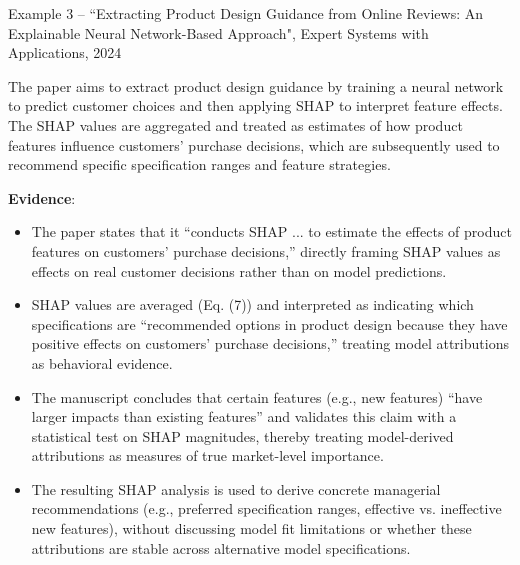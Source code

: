 \documentclass[11pt]{article}
\newcounter{se}[section]
\begin{document}
\begin{mainbox}{Example 3 – ``Extracting Product Design Guidance from Online Reviews: An Explainable Neural Network-Based Approach", Expert Systems with Applications, 2024}

The paper aims to extract product design guidance by training a neural network to predict customer choices and then applying SHAP to interpret feature effects. The SHAP values are aggregated and treated as estimates of how product features influence customers’ purchase decisions, which are subsequently used to recommend specific specification ranges and feature strategies.

\vspace{0.2cm}

\textbf{Evidence}:
\begin{itemize}

\item The paper states that it ``conducts SHAP ... to estimate the effects of product features on customers’ purchase decisions,'' directly framing SHAP values as effects on real customer decisions rather than on model predictions.

\item SHAP values are averaged (Eq. (7)) and interpreted as indicating which specifications are ``recommended options in product design because they have positive effects on customers’ purchase decisions,'' treating model attributions as behavioral evidence.

\item The manuscript concludes that certain features (e.g., new features) ``have larger impacts than existing features'' and validates this claim with a statistical test on SHAP magnitudes, thereby treating model-derived attributions as measures of true market-level importance.

\item The resulting SHAP analysis is used to derive concrete managerial recommendations (e.g., preferred specification ranges, effective vs. ineffective new features), without discussing model fit limitations or whether these attributions are stable across alternative model specifications.

\end{itemize}

\end{mainbox}

\vspace{0.5cm}
\end{document}
